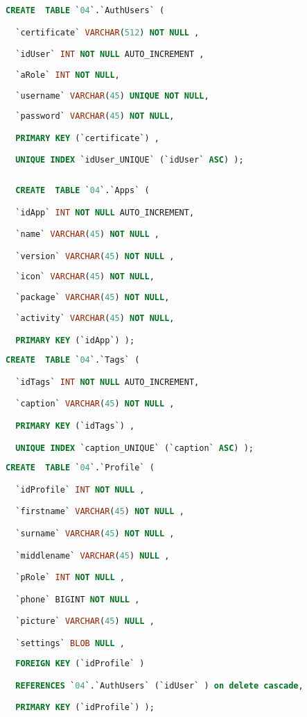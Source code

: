 \begin{lstlisting}[language=SQL,breaklines=true, label=createAuthUsers, caption=Create AuthUsers, float]
  CREATE  TABLE `04`.`AuthUsers` (

  `certificate` VARCHAR(512) NOT NULL ,

  `idUser` INT NOT NULL AUTO_INCREMENT ,
  
  `aRole` INT NOT NULL,
    
  `username` VARCHAR(45) UNIQUE NOT NULL,
  
  `password` VARCHAR(45) NOT NULL,

  PRIMARY KEY (`certificate`) ,

  UNIQUE INDEX `idUser_UNIQUE` (`idUser` ASC) );
\end{lstlisting}

\begin{lstlisting}[language=SQL,breaklines=true, label=createApps, caption=Create Apps]
  
  CREATE  TABLE `04`.`Apps` (

  `idApp` INT NOT NULL AUTO_INCREMENT,

  `name` VARCHAR(45) NOT NULL ,

  `version` VARCHAR(45) NOT NULL ,
  
  `icon` VARCHAR(45) NOT NULL,
  
  `package` VARCHAR(45) NOT NULL,
  
  `activity` VARCHAR(45) NOT NULL,

  PRIMARY KEY (`idApp`) );
\end{lstlisting}

\begin{lstlisting}[language=SQL,breaklines=true, label=createTags, caption=Create Tags]
CREATE  TABLE `04`.`Tags` (

  `idTags` INT NOT NULL AUTO_INCREMENT,

  `caption` VARCHAR(45) NOT NULL ,

  PRIMARY KEY (`idTags`) ,

  UNIQUE INDEX `caption_UNIQUE` (`caption` ASC) );

\end{lstlisting}

\begin{lstlisting}[language=SQL,breaklines=true, label=createProfile, caption=Create Profile]
CREATE  TABLE `04`.`Profile` (

  `idProfile` INT NOT NULL ,

  `firstname` VARCHAR(45) NOT NULL ,

  `surname` VARCHAR(45) NOT NULL ,

  `middlename` VARCHAR(45) NULL ,

  `pRole` INT NOT NULL ,

  `phone` BIGINT NOT NULL ,

  `picture` VARCHAR(45) NULL ,

  `settings` BLOB NULL ,
  
  FOREIGN KEY (`idProfile` )

  REFERENCES `04`.`AuthUsers` (`idUser` ) on delete cascade,

  PRIMARY KEY (`idProfile`) );
\end{lstlisting}

